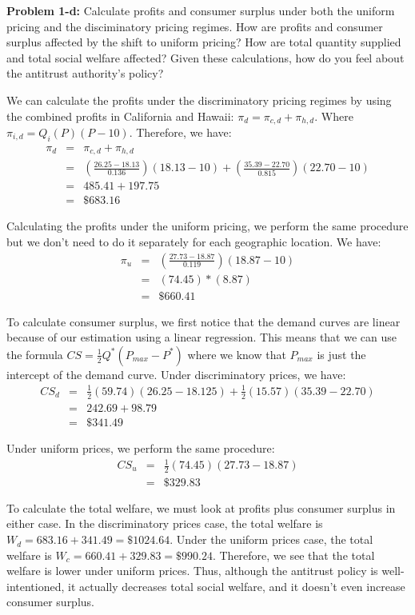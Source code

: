 \documentclass[psamsfonts]{amsart}
\newenvironment{sol}{\vspace{0.25cm}{\large \bfseries Solution:}}{\qedsymbol}
\newenvironment{prob}[1]{\begin{framed}{\large \bfseries Problem #1:}}{\end{framed}}
\begin{document}
\begin{prob}{1-d}
Calculate profits and consumer surplus under both the uniform pricing and the disciminatory pricing regimes. How are profits and consumer surplus affected by the shift to uniform pricing? How are total quantity supplied and total social welfare affected? Given these calculations, how do you feel about the antitrust authority’s policy?
\end{prob}
\begin{sol}
We can calculate the profits under the discriminatory pricing regimes by using the combined profits in California and Hawaii: $\pi_{d} = \pi_{c,d} + \pi_{h, d}$. Where $\pi_{i, d} = Q_i (P) (P - 10)$. Therefore, we have:
\begin{eqnarray}
\pi_d &=& \pi_{c,d} + \pi_{h,d} \\
&=& \left( \frac{26.25 - 18.13}{0.136} \right) (18.13 - 10) + \left( \frac{35.39 - 22.70}{0.815} \right) (22.70 - 10) \\
&=& 485.41 + 197.75 \\
&=& \$683.16
\end{eqnarray}

Calculating the profits under the uniform pricing, we perform the same procedure but we don't need to do it separately for each geographic location. We have:
\begin{eqnarray}
\pi_u &=& \left( \frac{27.73 - 18.87}{0.119}\right) (18.87 - 10) \\
&=& (74.45)*(8.87) \\
&=& \$660.41
\end{eqnarray}

To calculate consumer surplus, we first notice that the demand curves are linear because of our estimation using a linear regression. This means that we can use the formula $CS = \frac{1}{2} Q^* (P_{max} - P^*)$ where we know that $P_{max}$ is just the intercept of the demand curve. Under discriminatory prices, we have:
\begin{eqnarray}
CS_{d} &=& \frac{1}{2} (59.74) (26.25 - 18.125) + \frac{1}{2} (15.57)(35.39 - 22.70) \\
&=& 242.69 + 98.79 \\
&=& \$ 341.49
\end{eqnarray}

Under uniform prices, we perform the same procedure:
\begin{eqnarray}
CS_{u} &=& \frac{1}{2} (74.45) (27.73 - 18.87) \\
&=& \$ 329.83
\end{eqnarray}

To calculate the total welfare, we must look at profits plus consumer surplus in either case. In the discriminatory prices case, the total welfare is $W_d = 683.16 + 341.49 = \$1024.64$. Under the uniform prices case, the total welfare is $W_c = 660.41 + 329.83 = \$990.24$. Therefore, we see that the total welfare is lower under uniform prices. Thus, although the antitrust policy is well-intentioned, it actually decreases total social welfare, and it doesn't even increase consumer surplus.  
\end{sol}
\end{document}
